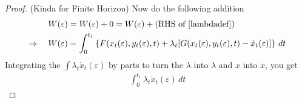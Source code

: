 \documentclass[12pt]{article}
\numberwithin{equation}{section} %
\theoremstyle{plain}
\theoremstyle{definition}
\theoremstyle{remark}
\begin{document}
\begin{proof}{(Kinda for Finite Horizon)}
Now do the following addition
\begin{align*}
  W(\varepsilon) &= W(\varepsilon) + 0
  = W(\varepsilon) +\text{(RHS of \ref{lambdadef})} \\
  \Rightarrow \quad
  W(\varepsilon) &=
  \int^{t_1}_0
  \left\{
  F(x_t(\varepsilon), y_t(\varepsilon), t)
  + \lambda_t [
    G(x_t(\varepsilon), y_t(\varepsilon), t) -
    \dot{x}_t(\varepsilon)
  ]
  \right\}\, dt
\end{align*}
Integrating the $\int \lambda_t \dot{x}_t(\varepsilon)$ by parts to turn
the $\lambda$ into $\dot{\lambda}$ and $x$ into $\dot{x}$, you get
\begin{align*}
  \int^{t_1}_0 \lambda_t \dot{x}_t(\varepsilon) \, dt
\end{align*}
\end{proof}
\end{document}
